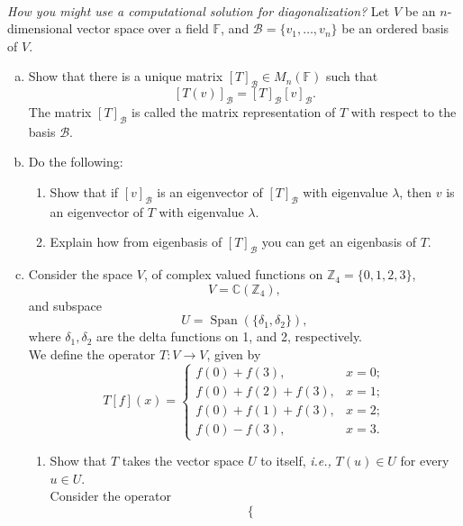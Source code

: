 \documentclass{article}
\def\zz{{\mathbb Z}}
\def\cc{{\mathbb C}}
\begin{document}
\begin{problem} \\ 
    \textit{How you might use a computational solution for diagonalization?} Let $V$ be an $n$-dimensional vector space over a field $\mathbb{F}$, and $\mathscr{B} = \{ v_1, \ldots, v_n \}$ be an ordered basis of $V$. 
    \begin{enumerate}[(a)]
        \item Show that there is a unique matrix $[T]_{\mathscr{B}} \in M_{n}(\mathbb{F})$ such that
        \[
            [T(v)]_{\mathscr{B}} = [T]_{\mathscr{B}} [v]_{\mathscr{B}}.
        \]
        The matrix $[T]_{\mathscr{B}}$ is called the matrix representation of $T$ with respect to the basis $\mathscr{B}$.
        \item Do the following:
        \begin{enumerate}[1.]
            \item Show that if $[v]_{\mathscr{B}}$ is an eigenvector of $[T]_{\mathscr{B}}$ with eigenvalue $\lambda$, then $v$ is an eigenvector of $T$ with eigenvalue $\lambda$.
            \item Explain how from eigenbasis of $[T]_{\mathscr{B}}$ you can get an eigenbasis of $T$.
        \end{enumerate}
        \item Consider the space $V$, of complex valued functions on $\zz_4 = \{0, 1, 2, 3\}$, 
        \[
            V = \cc(\zz_4),
        \]
        and subspace 
        \[
            U = \operatorname{Span}(\{\delta_1, \delta_2 \}),
        \]
        where $\delta_1, \delta_2$ are the delta functions on 1, and 2, respectively. \\
        We define the operator $T: V \to V$, given by 
        \[
           T[f](x) =  \begin{cases}
                f(0) + f(3), & x = 0; \\
                f(0) + f(2) + f(3), & x = 1; \\
                f(0) + f(1) + f(3), & x = 2; \\
                f(0) - f(3), & x = 3.
            \end{cases}
        \]
        \begin{enumerate}[1.]
            \item Show that $T$ takes the vector space $U$ to itself, \textit{i.e.,} $T(u) \in U$ for every $u \in U$. \\
            Consider the operator
            \[
                \begin{cases}

\end{cases}\]
\end{enumerate}
\end{enumerate}
\end{problem}
\end{document}
